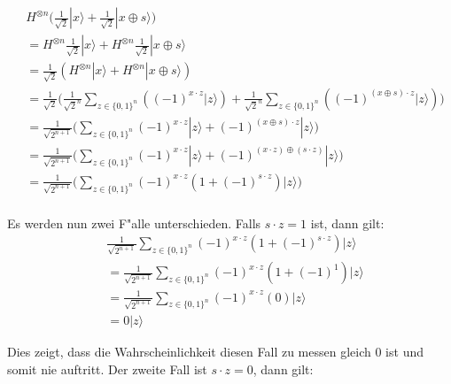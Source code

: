 \begin{refsection}
\begin{align*}
    &H^{ \otimes n } \biggl( 
                     \frac{1}{\sqrt{2}} |x\rangle + 
                     \frac{1}{\sqrt{2}} |x \oplus s\rangle 
                     \biggr)
    \\
    &= H^{ \otimes n } \frac{1}{\sqrt{2}} |x\rangle + 
       H^{ \otimes n } \frac{1}{\sqrt{2}} |x \oplus s\rangle 
    \\ 
    &= \frac1{\sqrt{2}} ( H^{ \otimes n } |x\rangle + H^{ \otimes n } |x \oplus s\rangle )
    \\
    &= \frac1{\sqrt{2}}
       \biggl( \frac1{\sqrt{2}^n} \sum_{z \in \{0,1\}^n} {( (-1)^{x \cdot z} |z\rangle )} + 
               \frac1{\sqrt{2}^n}  \sum_{z \in \{0,1\}^n} { ( (-1)^{(x \oplus s) \cdot z } |z\rangle)}
       \biggr)
    \\
    &= \frac1{\sqrt{2^{n + 1}}}
       \biggl( \sum_{z \in \{0,1\}^n}  { 
                   (-1)^{x \cdot z} |z\rangle + (-1)^{(x \oplus s) \cdot z } |z\rangle 
               } 
       \biggr)
    \\
    &= \frac1{\sqrt{2^{n + 1}}}
       \biggl( \sum_{z \in \{0,1\}^n}  { 
                  (-1)^{x \cdot z} |z\rangle + (-1)^{(x \cdot z) \oplus ( s \cdot z) } |z\rangle 
               } 
       \biggr)
    \\
    &= \frac1{\sqrt{2^{n + 1}}}
       \biggl( 
          \sum_{z \in \{0,1\}^n}  { (-1)^{x \cdot z} ( 1 + (-1)^{ s \cdot z}) |z\rangle } 
       \biggr)
    \\
\end{align*}

Es werden nun zwei F"alle unterschieden. Falls $s \cdot z = 1$ ist, dann gilt:
\begin{align*}
    &\frac1{\sqrt{2^{n + 1}}}
      \sum_{z \in \{0,1\}^n}  { (-1)^{x \cdot z} ( 1 + (-1)^{ s \cdot z}) |z\rangle } 
    \\
    &= 
    \frac1{\sqrt{2^{n + 1}}}
      \sum_{z \in \{0,1\}^n}  { (-1)^{x \cdot z} ( 1 + (-1)^1) |z\rangle } 
    \\
    &= 
    \frac1{\sqrt{2^{n + 1}}}
      \sum_{z \in \{0,1\}^n}  { (-1)^{x \cdot z} (0) |z\rangle } 
    \\
    &=
    0 |z\rangle
\end{align*}

Dies zeigt, dass die Wahrscheinlichkeit diesen Fall zu messen gleich 0 ist und
somit nie auftritt. Der zweite Fall ist $s \cdot z = 0$, dann gilt:


\end{refsection}
